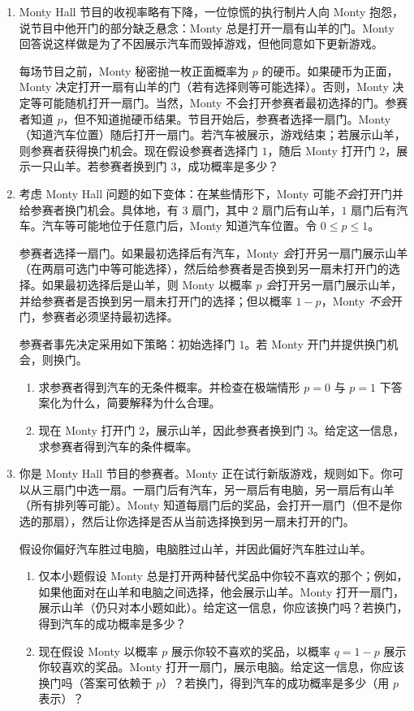 \documentclass[UTF8, 12pt, fontset=fandol, oneside]{ctexart}
\begin{document}
\begin{enumerate}
  \item Monty Hall 节目的收视率略有下降，一位惊慌的执行制片人向 Monty 抱怨，说节目中他开门的部分缺乏悬念：Monty 总是打开一扇有山羊的门。Monty 回答说这样做是为了不因展示汽车而毁掉游戏，但他同意如下更新游戏。

  每场节目之前，Monty 秘密抛一枚正面概率为 $p$ 的硬币。如果硬币为正面，Monty 决定打开一扇有山羊的门（若有选择则等可能选择）。否则，Monty 决定等可能随机打开一扇门。当然，Monty 不会打开参赛者最初选择的门。参赛者知道 $p$，但不知道抛硬币结果。节目开始后，参赛者选择一扇门。Monty（知道汽车位置）随后打开一扇门。若汽车被展示，游戏结束；若展示山羊，则参赛者获得换门机会。现在假设参赛者选择门 $1$，随后 Monty 打开门 $2$，展示一只山羊。若参赛者换到门 $3$，成功概率是多少？

  \item 考虑 Monty Hall 问题的如下变体：在某些情形下，Monty 可能\textit{不会}打开门并给参赛者换门机会。具体地，有 $3$ 扇门，其中 $2$ 扇门后有山羊，$1$ 扇门后有汽车。汽车等可能地位于任意门后，Monty 知道汽车位置。令 $0\le p\le 1$。

  参赛者选择一扇门。如果最初选择后有汽车，Monty \textit{会}打开另一扇门展示山羊（在两扇可选门中等可能选择），然后给参赛者是否换到另一扇未打开门的选择。如果最初选择后是山羊，则 Monty 以概率 $p$ \textit{会}打开另一扇门展示山羊，并给参赛者是否换到另一扇未打开门的选择；但以概率 $1-p$，Monty \textit{不会}开门，参赛者必须坚持最初选择。

  参赛者事先决定采用如下策略：初始选择门 $1$。若 Monty 开门并提供换门机会，则换门。
  \begin{enumerate}
    \item 求参赛者得到汽车的无条件概率。并检查在极端情形 $p=0$ 与 $p=1$ 下答案化为什么，简要解释为什么合理。
    \item 现在 Monty 打开门 $2$，展示山羊，因此参赛者换到门 $3$。给定这一信息，求参赛者得到汽车的条件概率。
  \end{enumerate}

  \item 你是 Monty Hall 节目的参赛者。Monty 正在试行新版游戏，规则如下。你可以从三扇门中选一扇。一扇门后有汽车，另一扇后有电脑，另一扇后有山羊（所有排列等可能）。Monty 知道每扇门后的奖品，会打开一扇门（但不是你选的那扇），然后让你选择是否从当前选择换到另一扇未打开的门。

  假设你偏好汽车胜过电脑，电脑胜过山羊，并因此偏好汽车胜过山羊。
  \begin{enumerate}
    \item 仅本小题假设 Monty 总是打开两种替代奖品中你较不喜欢的那个；例如，如果他面对在山羊和电脑之间选择，他会展示山羊。Monty 打开一扇门，展示山羊（仍只对本小题如此）。给定这一信息，你应该换门吗？若换门，得到汽车的成功概率是多少？
    \item 现在假设 Monty 以概率 $p$ 展示你较不喜欢的奖品，以概率 $q=1-p$ 展示你较喜欢的奖品。Monty 打开一扇门，展示电脑。给定这一信息，你应该换门吗（答案可依赖于 $p$）？若换门，得到汽车的成功概率是多少（用 $p$ 表示）？
  \end{enumerate}


\end{enumerate}
\end{document}

